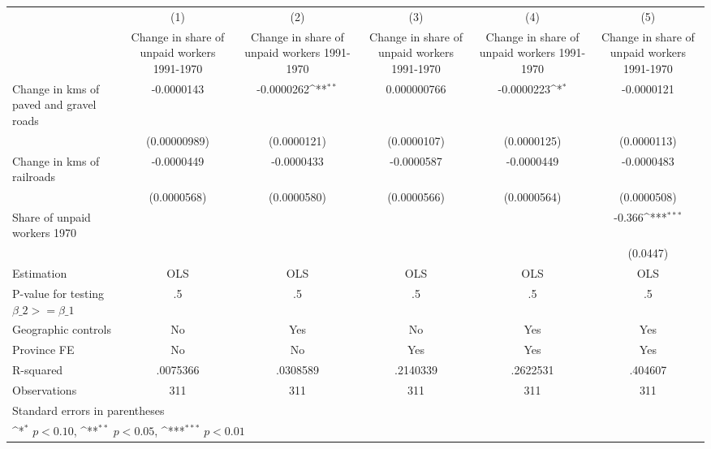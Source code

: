 {
\def\sym#1{\ifmmode^{#1}\else\(^{#1}\)\fi}
\begin{tabular}{l*{5}{c}}
\hline\hline
                    &\multicolumn{1}{c}{(1)}&\multicolumn{1}{c}{(2)}&\multicolumn{1}{c}{(3)}&\multicolumn{1}{c}{(4)}&\multicolumn{1}{c}{(5)}\\
                    &\multicolumn{1}{c}{Change in share of unpaid workers 1991-1970}&\multicolumn{1}{c}{Change in share of unpaid workers 1991-1970}&\multicolumn{1}{c}{Change in share of unpaid workers 1991-1970}&\multicolumn{1}{c}{Change in share of unpaid workers 1991-1970}&\multicolumn{1}{c}{Change in share of unpaid workers 1991-1970}\\
\hline
Change in kms of paved and gravel roads&  -0.0000143         &  -0.0000262\sym{**} & 0.000000766         &  -0.0000223\sym{*}  &  -0.0000121         \\
                    &(0.00000989)         & (0.0000121)         & (0.0000107)         & (0.0000125)         & (0.0000113)         \\
[1em]
Change in kms of railroads&  -0.0000449         &  -0.0000433         &  -0.0000587         &  -0.0000449         &  -0.0000483         \\
                    & (0.0000568)         & (0.0000580)         & (0.0000566)         & (0.0000564)         & (0.0000508)         \\
[1em]
Share of unpaid workers 1970&                     &                     &                     &                     &      -0.366\sym{***}\\
                    &                     &                     &                     &                     &    (0.0447)         \\
\hline
Estimation          &         OLS         &         OLS         &         OLS         &         OLS         &         OLS         \\
P-value for testing $\beta\_2 >= \beta\_1$&          .5         &          .5         &          .5         &          .5         &          .5         \\
Geographic controls &          No         &         Yes         &          No         &         Yes         &         Yes         \\
Province FE         &          No         &          No         &         Yes         &         Yes         &         Yes         \\
R-squared           &    .0075366         &    .0308589         &    .2140339         &    .2622531         &     .404607         \\
Observations        &         311         &         311         &         311         &         311         &         311         \\
\hline\hline
\multicolumn{6}{l}{\footnotesize Standard errors in parentheses}\\
\multicolumn{6}{l}{\footnotesize \sym{*} \(p<0.10\), \sym{**} \(p<0.05\), \sym{***} \(p<0.01\)}\\
\end{tabular}
}
